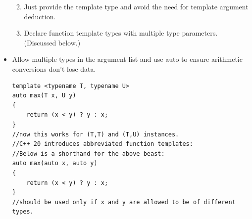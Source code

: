 \documentclass{report}
\begin{document}
\begin{itemize}
\begin{enumerate}
\begin{itemize}
\end{itemize}
\item Just provide the template type and avoid the need for template argument deduction.
\item Declare function template types with multiple type parameters. (Discussed below.)
\end{enumerate}
\item Allow multiple types in the argument list and use auto to ensure arithmetic conversions don't lose data.
\begin{lstlisting}
template <typename T, typename U>
auto max(T x, U y)
{
    return (x < y) ? y : x;
}
//now this works for (T,T) and (T,U) instances.    
//C++ 20 introduces abbreviated function templates:
//Below is a shorthand for the above beast:
auto max(auto x, auto y)
{
    return (x < y) ? y : x;
}
//should be used only if x and y are allowed to be of different types.
\end{lstlisting}
\end{itemize}
\end{document}
